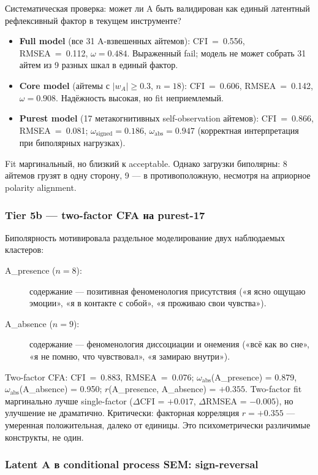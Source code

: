Систематическая проверка: может ли A быть валидирован как единый латентный рефлексивный фактор в текущем инструменте?

\begin{itemize}
    \item \textbf{Full model} (все 31 A-взвешенных айтемов): CFI~=~0.556, RMSEA~=~0.112, $\omega = 0.484$. Выраженный fail; модель не может собрать 31 айтем из 9 разных шкал в единый фактор.
    \item \textbf{Core model} (айтемы с $|w_A| \geq 0.3$, $n = 18$): CFI~=~0.606, RMSEA~=~0.142, $\omega = 0.908$. Надёжность высокая, но fit неприемлемый.
    \item \textbf{Purest model} (17 метакогнитивных self-observation айтемов): CFI~=~0.866, RMSEA~=~0.081; $\omega_{\text{signed}} = 0.186$, $\omega_{\text{abs}} = 0.947$ (корректная интерпретация при биполярных нагрузках).
\end{itemize}

Fit маргинальный, но близкий к acceptable. Однако загрузки биполярны: 8 айтемов грузят в одну сторону, 9 --- в противоположную, несмотря на априорное polarity alignment.

\subsubsection{Tier 5b --- two-factor CFA на purest-17}

Биполярность мотивировала раздельное моделирование двух наблюдаемых кластеров:
\begin{description}
    \item[A\_presence ($n = 8$):] содержание --- позитивная феноменология присутствия («я ясно ощущаю эмоции», «я в контакте с собой», «я проживаю свои чувства»).
    \item[A\_absence ($n = 9$):] содержание --- феноменология диссоциации и онемения («всё как во сне», «я не помню, что чувствовал», «я замираю внутри»).
\end{description}

Two-factor CFA: CFI~=~0.883, RMSEA~=~0.076; $\omega_{\text{abs}}$(A\_presence) = 0.879, $\omega_{\text{abs}}$(A\_absence) = 0.950; $r$(A\_presence, A\_absence) = $+0.355$. Two-factor fit маргинально лучше single-factor ($\Delta$CFI = $+0.017$, $\Delta$RMSEA = $-0.005$), но улучшение не драматично. Критически: факторная корреляция $r = +0.355$ --- умеренная положительная, далеко от единицы. Это психометрически различимые конструкты, не один.

\subsubsection{Latent A в conditional process SEM: sign-reversal}

